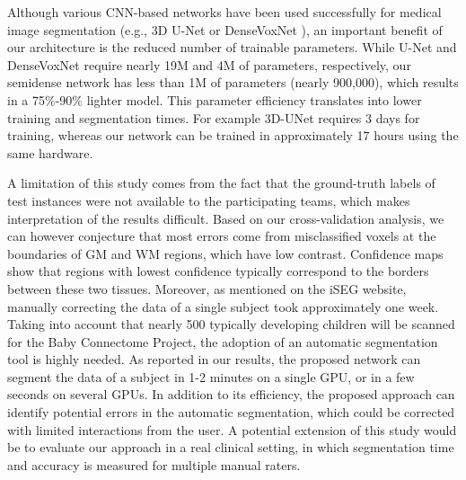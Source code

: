 \documentclass[twoside,espcrc2]{elsarticle}
\begin{document}
Although various CNN-based networks have been used successfully for medical image segmentation (e.g., 3D U-Net \cite{cciccek20163d} or DenseVoxNet \cite{yu2017automatic}), an important benefit of our architecture is the reduced number of trainable parameters. While U-Net and DenseVoxNet require nearly 19M and 4M of parameters, respectively, our semidense network has less than 1M of parameters (nearly 900,000), which results in a 75$\%$-90$\%$ lighter model. This parameter efficiency translates into lower training and segmentation times. For example 3D-UNet requires 3 days for training, whereas our network can be trained in approximately 17 hours using the same hardware. 




A limitation of this study comes from the fact that the ground-truth labels of test instances were not available to the participating teams, which makes interpretation of the results difficult. Based on our cross-validation analysis, we can however conjecture that most errors come from misclassified voxels at the boundaries of GM and WM regions, which have low contrast. Confidence maps show that regions with lowest confidence typically correspond to the borders between these two tissues. Moreover, as mentioned on the iSEG website, manually correcting the data of a single subject took approximately one week. Taking into account that nearly 500 typically developing children will be scanned for the Baby Connectome Project, the adoption of an automatic segmentation tool is highly needed. As reported in our results, the proposed network can segment the data of a subject in 1-2 minutes on a single GPU, or in a few seconds on several GPUs. In addition to its efficiency, the proposed approach can identify potential errors in the automatic segmentation, which could be corrected with limited interactions from the user. A potential extension of this study would be to evaluate our approach in a real clinical setting, in which segmentation time and accuracy is measured for multiple manual raters.

\end{document}
